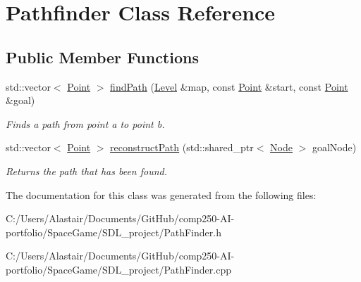\hypertarget{class_pathfinder}{}\section{Pathfinder Class Reference}
\label{class_pathfinder}
\subsection*{Public Member Functions}
\begin{DoxyCompactItemize}
\item 
\mbox{\label{class_pathfinder_ace267e4493784637e9b33763b0db3842}} 
std\+::vector$<$ \hyperlink{class_point}{Point} $>$ \hyperlink{class_pathfinder_ace267e4493784637e9b33763b0db3842}{find\+Path} (\hyperlink{class_level}{Level} \&map, const \hyperlink{class_point}{Point} \&start, const \hyperlink{class_point}{Point} \&goal)
\begin{DoxyCompactList}\small\item\em Finds a path from point a to point b. \end{DoxyCompactList}\item 
\mbox{\label{class_pathfinder_a2d9dc454747b93b773b941cbc0445a0f}} 
std\+::vector$<$ \hyperlink{class_point}{Point} $>$ \hyperlink{class_pathfinder_a2d9dc454747b93b773b941cbc0445a0f}{reconstruct\+Path} (std\+::shared\+\_\+ptr$<$ \hyperlink{class_node}{Node} $>$ goal\+Node)
\begin{DoxyCompactList}\small\item\em Returns the path that has been found. \end{DoxyCompactList}\end{DoxyCompactItemize}


The documentation for this class was generated from the following files\+:\begin{DoxyCompactItemize}
\item 
C\+:/\+Users/\+Alastair/\+Documents/\+Git\+Hub/comp250-\/\+A\+I-\/portfolio/\+Space\+Game/\+S\+D\+L\+\_\+project/Path\+Finder.\+h\item 
C\+:/\+Users/\+Alastair/\+Documents/\+Git\+Hub/comp250-\/\+A\+I-\/portfolio/\+Space\+Game/\+S\+D\+L\+\_\+project/Path\+Finder.\+cpp\end{DoxyCompactItemize}
